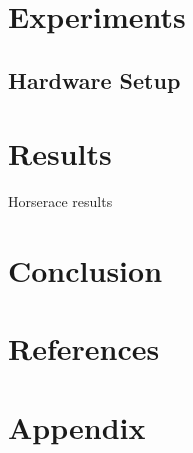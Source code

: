 \documentclass[12pt, a4paper]{article}
\begin{document}
\section{Experiments}
\subsection{Hardware Setup}


\section{Results}


\begin{table}[p]
\begin{center}
\label{tbl:horse}

\caption{Horserace results}
\end{center}
\end{table}

\section{Conclusion}

\section{References}

\section{Appendix}
\end{document}
